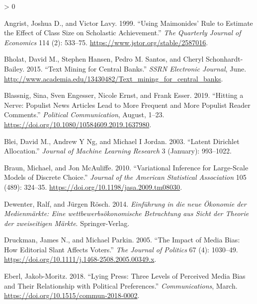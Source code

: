 \documentclass[
  12pt,
]{article}
\newlength{\cslhangindent}
\newenvironment{CSLReferences}[2] %
 {%
  \setlength{\parindent}{0pt}
  \ifodd #1 \everypar{\setlength{\hangindent}{\cslhangindent}}\ignorespaces\fi
  \ifnum #2 > 0
  \setlength{\parskip}{#2\baselineskip}
  \fi
 }%
 {}
\begin{document}
\hypertarget{refs}{}
\begin{CSLReferences}{1}{0}
\leavevmode\hypertarget{ref-angrist_using_1999}{}%
Angrist, Joshua D., and Victor Lavy. 1999. {``Using Maimonides' Rule to
Estimate the Effect of Class Size on Scholastic Achievement.''}
\emph{The Quarterly Journal of Economics} 114 (2): 533--75.
\url{https://www.jstor.org/stable/2587016}.

\leavevmode\hypertarget{ref-bholat_text_2015}{}%
Bholat, David M., Stephen Hansen, Pedro M. Santos, and Cheryl
Schonhardt-Bailey. 2015. {``Text Mining for Central Banks.''}
\emph{{SSRN} Electronic Journal}, June.
\url{http://www.academia.edu/13430482/Text_mining_for_central_banks}.

\leavevmode\hypertarget{ref-blassnig_hitting_2019}{}%
Blassnig, Sina, Sven Engesser, Nicole Ernst, and Frank Esser. 2019.
{``Hitting a Nerve: Populist News Articles Lead to More Frequent and
More Populist Reader Comments.''} \emph{Political Communication},
August, 1--23. \url{https://doi.org/10.1080/10584609.2019.1637980}.

\leavevmode\hypertarget{ref-blei_latent_2003}{}%
Blei, David M., Andrew Y Ng, and Michael I Jordan. 2003. {``Latent
Dirichlet Allocation.''} \emph{Journal of Machine Learning Research} 3
(January): 993--1022.

\leavevmode\hypertarget{ref-braun_variational_2010}{}%
Braun, Michael, and Jon McAuliffe. 2010. {``Variational Inference for
Large-Scale Models of Discrete Choice.''} \emph{Journal of the American
Statistical Association} 105 (489): 324--35.
\url{https://doi.org/10.1198/jasa.2009.tm08030}.

\leavevmode\hypertarget{ref-dewenter_einfuhrung_2014}{}%
Dewenter, Ralf, and Jürgen Rösch. 2014. \emph{Einführung in die neue
Ökonomie der Medienmärkte: Eine wettbewerbsökonomische Betrachtung aus
Sicht der Theorie der zweiseitigen Märkte}. Springer-Verlag.

\leavevmode\hypertarget{ref-druckman_impact_2005}{}%
Druckman, James N., and Michael Parkin. 2005. {``The Impact of Media
Bias: How Editorial Slant Affects Voters.''} \emph{The Journal of
Politics} 67 (4): 1030--49.
\url{https://doi.org/10.1111/j.1468-2508.2005.00349.x}.

\leavevmode\hypertarget{ref-eberl_lying_2018}{}%
Eberl, Jakob-Moritz. 2018. {``Lying Press: Three Levels of Perceived
Media Bias and Their Relationship with Political Preferences.''}
\emph{Communications}, March.
\url{https://doi.org/10.1515/commun-2018-0002}.


\end{CSLReferences}
\end{document}
